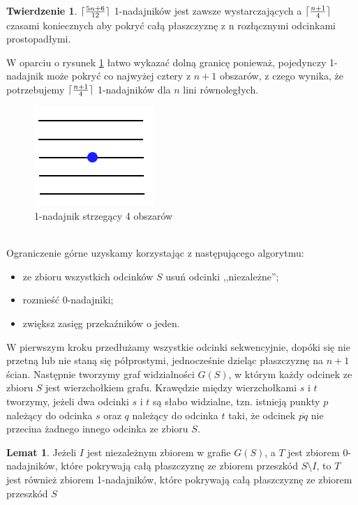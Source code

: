 \documentclass[brudnopis]{xmgr}
\DeclarePairedDelimiter\ceil{\lceil}{\rceil}
\theoremstyle{definition}
\newtheorem{Twierdzenie}{Twierdzenie}
\newtheorem{Lemat}{Lemat}
\begin{document}
\begin{Twierdzenie} \label{ograniczenie zbiór odcinków prostopadłych} \cite{knadajniki}
  $\ceil{\frac{5n+6}{12}}$ 1-nadajników jest zawsze wystarczających a $\ceil{\frac{n+1}{4}}$ czasami koniecznych aby pokryć całą płaszczyznę z n rozłącznymi odcinkami prostopadłymi.
\end{Twierdzenie}
\indent W oparciu o rysunek \ref{fig:ogr_dolne} łatwo wykazać dolną granicę ponieważ, pojedynczy 1-nadajnik może pokryć co najwyżej cztery z $n + 1$ obszarów, z czego wynika, że potrzebujemy $\ceil{\frac{n+1}{4}}$ 1-nadajników dla $n$ lini równoległych.
\begin{figure}[ht!]
  \centering
  \includegraphics{rysunki/k_nadajniki_ogr_dolne.png}
  \caption{1-nadajnik strzegący 4 obszarów}
  \label{fig:ogr_dolne}
\end{figure} 
\\\indent Ograniczenie górne uzyskamy korzystając z następującego algorytmu:
\begin{itemize}
  \item ze zbioru wszystkich odcinków $S$ usuń odcinki ,,niezależne'';
  \item rozmieść 0-nadajniki;
  \item zwiększ zasięg przekaźników o jeden.
\end{itemize}

W pierwszym kroku przedłużamy wszystkie odcinki sekwencyjnie, dopóki się nie przetną lub nie staną się półprostymi, jednocześnie dzieląc płaszczyznę na $n + 1$ ścian. Następnie tworzymy graf widzialności $G(S)$, w którym każdy odcinek ze zbioru $S$ jest wierzchołkiem grafu. Krawędzie między wierzchołkami $s$ i $t$ tworzymy, jeżeli dwa odcinki $s$ i $t$ są słabo widzialne, tzn. istnieją punkty $p$ należący do odcinka $s$ oraz $q$ należący do odcinka $t$ taki, że odcinek $\overline{pq}$ nie przecina żadnego innego odcinka ze zbioru $S$.

\begin{Lemat}\label{0-1-nadajniki} \cite{knadajniki}
  Jeżeli $I$ jest niezależnym zbiorem w grafie $G(S)$, a $T$ jest zbiorem 0-nadajników, które pokrywają całą płaszczyznę ze zbiorem przeszkód $S \setminus I$, to $T$ jest również zbiorem 1-nadajników, które pokrywają całą płaszczyznę ze zbiorem przeszkód $S$
\end{Lemat}
\end{document}
